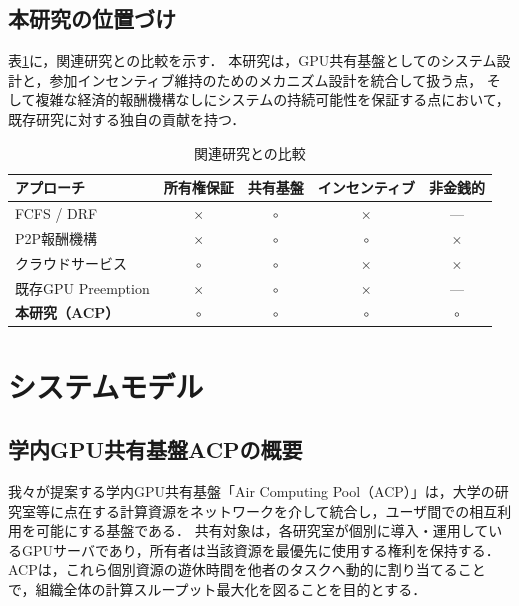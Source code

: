 \documentclass[12pt,a4paper]{jsarticle}
\begin{document}
\subsection{本研究の位置づけ}

表\ref{tab:related}に，関連研究との比較を示す．
本研究は，GPU共有基盤としてのシステム設計と，参加インセンティブ維持のためのメカニズム設計を統合して扱う点，
そして複雑な経済的報酬機構なしにシステムの持続可能性を保証する点において，
既存研究に対する独自の貢献を持つ．

\begin{table}[h]
  \centering
  \caption{関連研究との比較}
  \label{tab:related}
  \begin{tabular}{lcccc}
    \toprule
    アプローチ & 所有権保証 & 共有基盤 & インセンティブ & 非金銭的 \\
    \midrule
    FCFS / DRF & $\times$ & $\circ$ & $\times$ & --- \\
    P2P報酬機構 & $\times$ & $\circ$ & $\circ$ & $\times$ \\
    クラウドサービス & $\circ$ & $\circ$ & $\times$ & $\times$ \\
    既存GPU Preemption & $\times$ & $\circ$ & $\times$ & --- \\
    \textbf{本研究（ACP）} & $\mathbf{\circ}$ & $\mathbf{\circ}$ & $\mathbf{\circ}$ & $\mathbf{\circ}$ \\
    \bottomrule
  \end{tabular}
\end{table}

\section{システムモデル}

\subsection{学内GPU共有基盤ACPの概要}

我々が提案する学内GPU共有基盤「Air Computing Pool（ACP）」は，大学の研究室等に点在する計算資源をネットワークを介して統合し，ユーザ間での相互利用を可能にする基盤である．
共有対象は，各研究室が個別に導入・運用しているGPUサーバであり，所有者は当該資源を最優先に使用する権利を保持する．
ACPは，これら個別資源の遊休時間を他者のタスクへ動的に割り当てることで，組織全体の計算スループット最大化を図ることを目的とする．
\end{document}
